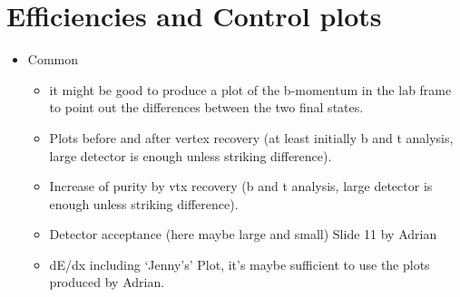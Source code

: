 \documentclass[preprint]{elsarticle}
\begin{document}
\section{Efficiencies and Control plots }
\begin{itemize}

\item Common
\begin{itemize}
\item it might be good to produce a plot of the b-momentum in the lab frame to point out the differences between the two final states.\item Plots before and after vertex recovery (at least initially b and t analysis, large detector is enough unless striking difference).
\item Increase of purity by vtx recovery (b and t analysis, large detector is enough unless striking difference).
\item Detector acceptance (here maybe large and small) Slide 11 by Adrian
\item dE/dx including `Jenny's' Plot, it's maybe sufficient to use the plots produced by Adrian.
\end{itemize}



\end{itemize}
\end{document}
